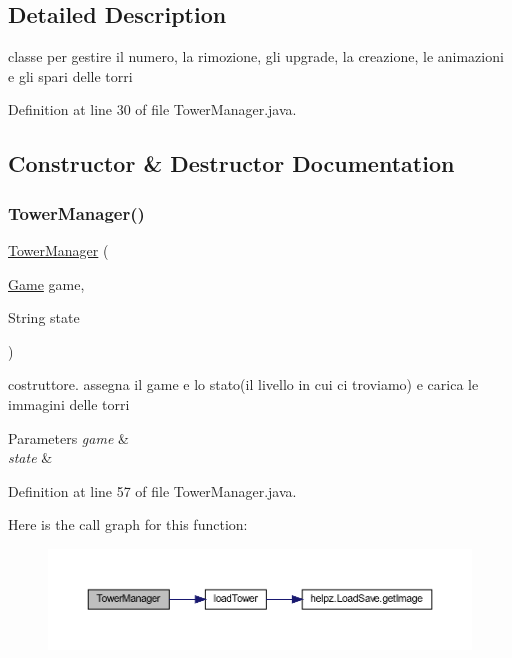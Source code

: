 \subsection{Detailed Description}
classe per gestire il numero, la rimozione, gli upgrade, la creazione, le animazioni e gli spari delle torri 

Definition at line 30 of file Tower\+Manager.\+java.



\subsection{Constructor \& Destructor Documentation}
\mbox{\label{classmanagers_1_1_tower_manager_a520c6411e4fe9307be91f5a8c7d8b774}} 
\subsubsection{\texorpdfstring{Tower\+Manager()}{TowerManager()}}
{\footnotesize\ttfamily \hyperlink{classmanagers_1_1_tower_manager}{Tower\+Manager} (\begin{DoxyParamCaption}\item[{\hyperlink{classprogetto_1_1_game}{Game}}]{game,  }\item[{String}]{state }\end{DoxyParamCaption})}



costruttore. assegna il game e lo stato(il livello in cui ci troviamo) e carica le immagini delle torri 


\begin{DoxyParams}{Parameters}
{\em game} & \\
\hline
{\em state} & \\
\hline
\end{DoxyParams}


Definition at line 57 of file Tower\+Manager.\+java.

Here is the call graph for this function\+:
\nopagebreak
\begin{figure}[H]
\begin{center}
\leavevmode
\includegraphics[width=350pt]{classmanagers_1_1_tower_manager_a520c6411e4fe9307be91f5a8c7d8b774_cgraph}
\end{center}
\end{figure}



